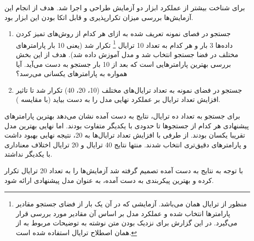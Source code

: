 	برای شناخت بیشتر از عملکرد ابزار
دو آزمایش طراحی و اجرا شد. هدف از انجام این آزمایش‌ها بررسی میزان تکرارپذیری و قابل اتکا بودن این ابزار بود. 
\begin{enumerate}
	\item
	 جستجو در فصای نمونه تعریف شده به ازای هر کدام از روش‌های تمیز کردن داده‌ها 3 بار و هر کدام به تعداد 10 ترایال
	 \footnote{منظور از ترایال همان
 می‌باشد. آزمایشی که در آن یک بار از فضای جستجو مقادیر پارامترها انتخاب شده و عملکرد مدل بر اساس آن مقادیر مورد بررسی قرار می‌گیرد. در این گزارش برای نزدیک بودن متن نوشته به توضیحات مربوط به 
از همان اصطلاح ترایال استفاده شده است.}
	  تکرار شد (یعنی 10 بار پارامترهای مختلف در فضا جستجو انتخاب شد و مدل آموزش داده شد).  هدف از این بخش بررسی بهترین پارامترهایی است که بعد از 10 بار جستجو  به دست می‌آید. آیا همواره به پارامترهای یکسانی می‌رسد؟
	
	\item
	
	جستجو در فضای نمونه به تعداد ترایال‌های مختلف (10، 20، 40) تکرار شد تا تاثیر افزایش تعداد ترایال بر عملکرد نهایی مدل را به دست بیاید (با مقایسه	
	).
	
\end{enumerate}

برای جستجو به تعداد ده ترایال، نتایج به دست آمده نشان می‌دهد بهترین پارامترهای پیشنهادی هر کدام از جستجوها تا حدودی با یکدیگر متفاوت بودند. اما 
نهایی بهترین مدل تقریبا یکسان بودند. از طرفی با افزایش تعداد ترایال‌ها به 20، نتیجه نهایی بهبود داشت و پارامترهای دقیق‌تری انتخاب شدند. منتها نتایج 40 ترایال و 20 ترایال اختلاف معناداری با یکدیگر نداشتد.

با توجه به نتایج به دست آمده تصمیم گرفته شد آزمایش‌ها را به تعداد 20 ترایال تکرار کرده و بهترین پیکربندی به دست آمده، به عنوان مدل پیشنهادی ارائه شود.

